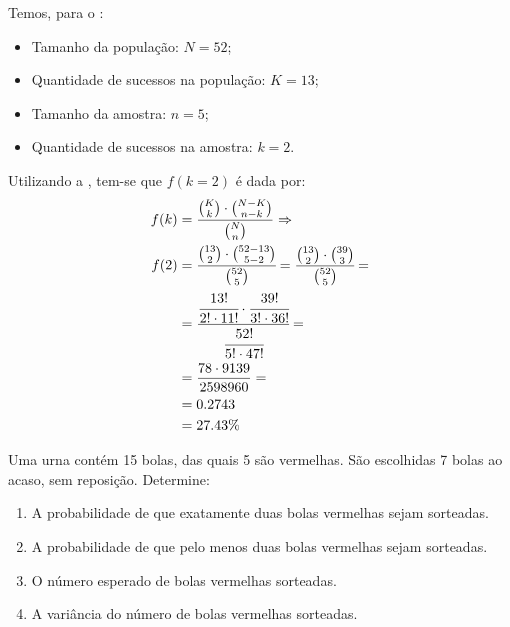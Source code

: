 \begin{sol}
Temos, para o :
\begin{itemize}
    \item Tamanho da população: $N=52$;
    \item Quantidade de sucessos na população: $K=13$;
    \item Tamanho da amostra: $n=5$;
    \item Quantidade de sucessos na amostra: $k=2$.
\end{itemize}

Utilizando a , tem-se que $f(k=2)$ é dada por:
\begin{align*}
    f(k) &= \frac{\binom{K}{k} \cdot \binom{N-K}{n-k}}{\binom{N}{n}} \implies \\
    f(2) &= \cfrac{\binom{13}{2} \cdot \binom{52-13}{5-2}}{\binom{52}{5}}
          = \cfrac{\binom{13}{2} \cdot \binom{39}{3}}{\binom{52}{5}} = \\
         &= \cfrac{\cfrac{13!}{2! \cdot 11!} \cdot \cfrac{39!}{3! \cdot 36!}}{\cfrac{52!}{5! \cdot 47!}} = \\
         &= \frac{78 \cdot 9139}{2598960} = \\
         &= 0.2743 \\
         &= 27.43 \%
\end{align*}
\end{sol}

\begin{eg}
Uma urna contém 15 bolas, das quais 5 são vermelhas. São escolhidas 7 bolas
ao acaso, sem reposição. Determine:
\begin{enumerate}[label=\alph*)]
    \item A probabilidade de que exatamente duas bolas vermelhas sejam sorteadas.
    \item A probabilidade de que pelo menos duas bolas vermelhas sejam sorteadas.
    \item O número esperado de bolas vermelhas sorteadas.
    \item A variância do número de bolas vermelhas sorteadas.
\end{enumerate}
\label{eg:urna-vermelhas}
\end{eg}

